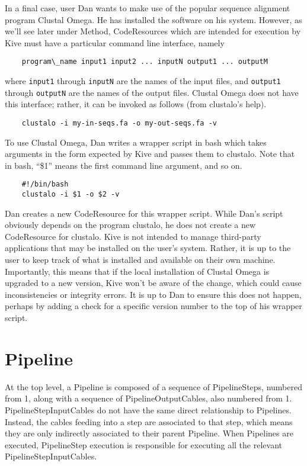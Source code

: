 \documentclass[12pt]{article}
\newcommand{\code}[1]{\texttt{#1}}
\begin{document}
In a final case, user Dan wants to make use of the popular sequence alignment
program Clustal Omega. He has installed the software on his system. However, as
we'll see later under Method, CodeResources which are intended for execution by
Kive must have a particular command line interface, namely
\begin{verbatim}
    program\_name input1 input2 ... inputN output1 ... outputM
\end{verbatim}
where \code{input1} through \code{inputN} are the names of the input files, and
\code{output1} through \code{outputN} are the names of the output files.
Clustal Omega does not have this interface; rather, it can be invoked as
follows (from clustalo's help).
\begin{verbatim}
    clustalo -i my-in-seqs.fa -o my-out-seqs.fa -v
\end{verbatim}
To use Clustal Omega, Dan writes a wrapper script in bash which takes arguments
in the form expected by Kive and passes them to clustalo. Note that in bash,
``\$1'' means the first command line argument, and so on.
\begin{verbatim}
    #!/bin/bash
    clustalo -i $1 -o $2 -v
\end{verbatim}
Dan creates a new CodeResource for this wrapper script. While Dan's script
obviously depends on the program clustalo, he does not create a new
CodeResource for clustalo. Kive is not intended to manage third-party
applications that may be installed on the user's system. Rather, it is up to
the user to keep track of what is installed and available on their own machine. 
Importantly, this means that if the local installation of Clustal Omega is
upgraded to a new version, Kive won't be aware of the change, which could
cause inconsistencies or integrity errors. It is up to Dan to ensure this does
not happen, perhaps by adding a check for a specific version number to the top
of his wrapper script.

\section*{Pipeline}

At the top level, a Pipeline is composed of a sequence of PipelineSteps,
numbered from 1, along with a sequence of PipelineOutputCables, also numbered
from 1. PipelineStepInputCables do not have the same direct relationship to
Pipelines. Instead, the cables feeding into a step are associated to that step,
which means they are only indirectly associated to their parent Pipeline. When
Pipelines are executed, PipelineStep execution is responsible for executing all
the relevant PipelineStepInputCables.
\end{document}
